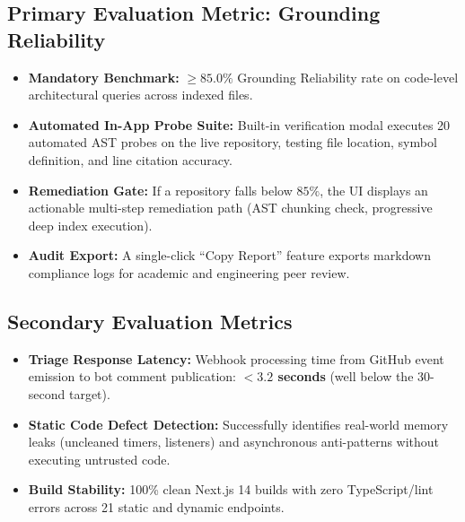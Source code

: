 \documentclass[11pt,a4paper]{article}
\begin{document}
\subsection{Primary Evaluation Metric: Grounding Reliability}
\begin{itemize}
    \item \textbf{Mandatory Benchmark:} $\ge 85.0\%$ Grounding Reliability rate on code-level architectural queries across indexed files.
    \item \textbf{Automated In-App Probe Suite:} Built-in verification modal executes 20 automated AST probes on the live repository, testing file location, symbol definition, and line citation accuracy.
    \item \textbf{Remediation Gate:} If a repository falls below $85\%$, the UI displays an actionable multi-step remediation path (AST chunking check, progressive deep index execution).
    \item \textbf{Audit Export:} A single-click ``Copy Report'' feature exports markdown compliance logs for academic and engineering peer review.
\end{itemize}

\subsection{Secondary Evaluation Metrics}
\begin{itemize}
    \item \textbf{Triage Response Latency:} Webhook processing time from GitHub event emission to bot comment publication: \textbf{$<3.2$ seconds} (well below the 30-second target).
    \item \textbf{Static Code Defect Detection:} Successfully identifies real-world memory leaks (uncleaned timers, listeners) and asynchronous anti-patterns without executing untrusted code.
    \item \textbf{Build Stability:} 100\% clean Next.js 14 builds with zero TypeScript/lint errors across 21 static and dynamic endpoints.
\end{itemize}
\end{document}
